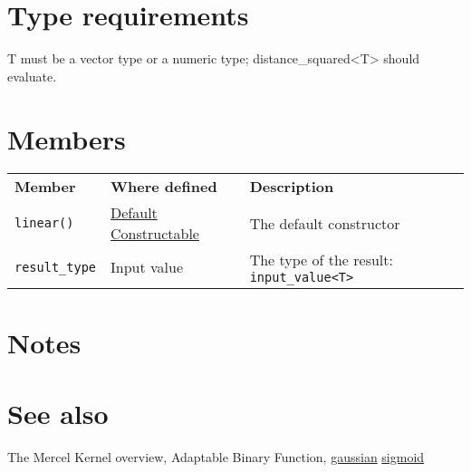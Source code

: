 \documentclass{article}
\begin{document}
\section*{Type requirements}

T must be a vector type or a numeric type; distance_squared<T> should evaluate.


\section*{Members}

\begin{tabular}{lll}
\textbf{Member} & \textbf{Where defined} & \textbf{Description} \\ 
\texttt{linear()} & \href{http://www.sgi.com/tech/stl/DefaultConstructible.html}{Default Constructable} & The default constructor \\
\texttt{result_type} & Input value & The type of the result: \texttt{input_value<T>} \\
\end{tabular}

\section*{Notes}

\section*{See also}

The Mercel Kernel overview, Adaptable Binary Function,
\href{research/kml/documentation/gaussian.html}{gaussian}
\href{research/kml/documentation/sigmoid.html}{sigmoid}



\end{document}
